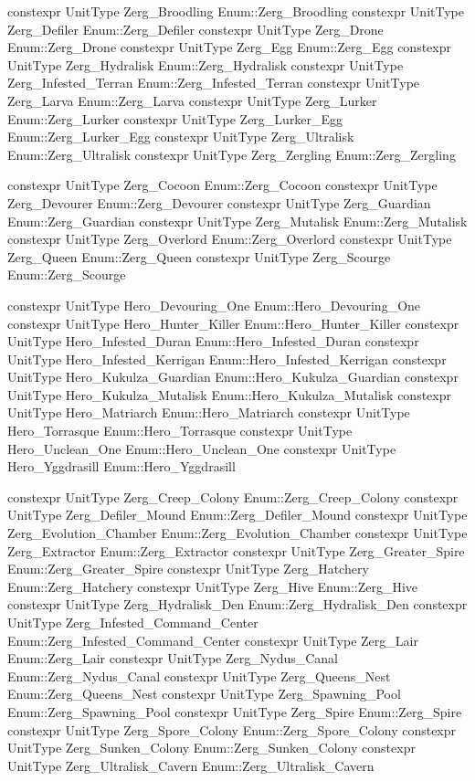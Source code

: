 \begin{codebox}[变量(虫族地面单位)]
constexpr UnitType Zerg_Broodling {Enum::Zerg_Broodling}
constexpr UnitType Zerg_Defiler {Enum::Zerg_Defiler}
constexpr UnitType Zerg_Drone {Enum::Zerg_Drone}
constexpr UnitType Zerg_Egg {Enum::Zerg_Egg}
constexpr UnitType Zerg_Hydralisk {Enum::Zerg_Hydralisk}
constexpr UnitType Zerg_Infested_Terran {Enum::Zerg_Infested_Terran}
constexpr UnitType Zerg_Larva {Enum::Zerg_Larva}
constexpr UnitType Zerg_Lurker {Enum::Zerg_Lurker}
constexpr UnitType Zerg_Lurker_Egg {Enum::Zerg_Lurker_Egg}
constexpr UnitType Zerg_Ultralisk {Enum::Zerg_Ultralisk}
constexpr UnitType Zerg_Zergling {Enum::Zerg_Zergling}
\end{codebox}
\begin{codebox}[变量(虫族空中单位)]
constexpr UnitType Zerg_Cocoon {Enum::Zerg_Cocoon}
constexpr UnitType Zerg_Devourer {Enum::Zerg_Devourer}
constexpr UnitType Zerg_Guardian {Enum::Zerg_Guardian}
constexpr UnitType Zerg_Mutalisk {Enum::Zerg_Mutalisk}
constexpr UnitType Zerg_Overlord {Enum::Zerg_Overlord}
constexpr UnitType Zerg_Queen {Enum::Zerg_Queen}
constexpr UnitType Zerg_Scourge {Enum::Zerg_Scourge}
\end{codebox}
\begin{codebox}[变量(虫族英雄单位)]
constexpr UnitType Hero_Devouring_One {Enum::Hero_Devouring_One}
constexpr UnitType Hero_Hunter_Killer {Enum::Hero_Hunter_Killer}
constexpr UnitType Hero_Infested_Duran {Enum::Hero_Infested_Duran}
constexpr UnitType Hero_Infested_Kerrigan {Enum::Hero_Infested_Kerrigan}
constexpr UnitType Hero_Kukulza_Guardian {Enum::Hero_Kukulza_Guardian}
constexpr UnitType Hero_Kukulza_Mutalisk {Enum::Hero_Kukulza_Mutalisk}
constexpr UnitType Hero_Matriarch {Enum::Hero_Matriarch}
constexpr UnitType Hero_Torrasque {Enum::Hero_Torrasque}
constexpr UnitType Hero_Unclean_One {Enum::Hero_Unclean_One}
constexpr UnitType Hero_Yggdrasill {Enum::Hero_Yggdrasill}
\end{codebox}
\begin{codebox}[变量(虫族建筑)]
constexpr UnitType Zerg_Creep_Colony {Enum::Zerg_Creep_Colony}
constexpr UnitType Zerg_Defiler_Mound {Enum::Zerg_Defiler_Mound}
constexpr UnitType Zerg_Evolution_Chamber {Enum::Zerg_Evolution_Chamber}
constexpr UnitType Zerg_Extractor {Enum::Zerg_Extractor}
constexpr UnitType Zerg_Greater_Spire {Enum::Zerg_Greater_Spire}
constexpr UnitType Zerg_Hatchery {Enum::Zerg_Hatchery}
constexpr UnitType Zerg_Hive {Enum::Zerg_Hive}
constexpr UnitType Zerg_Hydralisk_Den {Enum::Zerg_Hydralisk_Den}
constexpr UnitType Zerg_Infested_Command_Center {Enum::Zerg_Infested_Command_Center}
constexpr UnitType Zerg_Lair {Enum::Zerg_Lair}
constexpr UnitType Zerg_Nydus_Canal {Enum::Zerg_Nydus_Canal}
constexpr UnitType Zerg_Queens_Nest {Enum::Zerg_Queens_Nest}
constexpr UnitType Zerg_Spawning_Pool {Enum::Zerg_Spawning_Pool}
constexpr UnitType Zerg_Spire {Enum::Zerg_Spire}
constexpr UnitType Zerg_Spore_Colony {Enum::Zerg_Spore_Colony}
constexpr UnitType Zerg_Sunken_Colony {Enum::Zerg_Sunken_Colony}
constexpr UnitType Zerg_Ultralisk_Cavern {Enum::Zerg_Ultralisk_Cavern}
\end{codebox}
